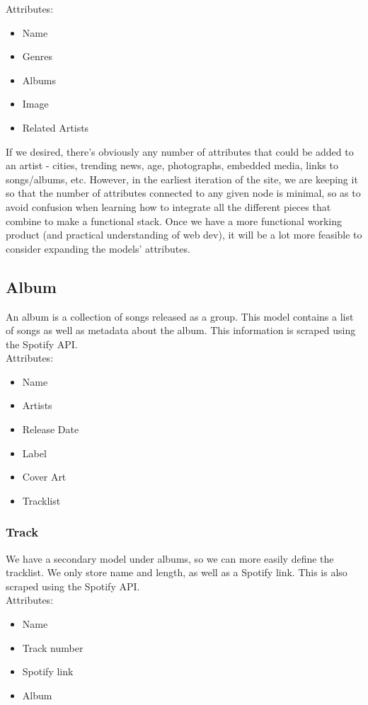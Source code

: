 \documentclass{scrartcl}
\begin{document}
Attributes:
\begin{itemize}
    \item Name
    \item Genres
    \item Albums
    \item Image
    \item Related Artists
\end{itemize}

If we desired, there’s obviously any number of attributes that could be added to an artist - cities, trending news, age, photographs, embedded media, links to songs/albums, etc. However, in the earliest iteration of the site, we are keeping it so that the number of attributes connected to any given node is minimal, so as to avoid confusion when learning how to integrate all the different pieces that combine to make a functional stack. Once we have a more functional working product (and practical understanding of web dev), it will be a lot more feasible to consider expanding the models’ attributes.

\subsection{Album}
An album is a collection of songs released as a group. This model contains a list of songs as well as metadata about the album. This information is scraped using the Spotify API.\\

Attributes:
\begin{itemize}
    \item Name
    \item Artists
    \item Release Date
    \item Label
    \item Cover Art
    \item Tracklist
\end{itemize}

\subsubsection{Track}
We have a secondary model under albums, so we can more easily define the tracklist. We only store name and length, as well as a Spotify link. This is also scraped using the Spotify API.\\

Attributes:
\begin{itemize}
    \item Name
    \item Track number
    \item Spotify link
    \item Album
\end{itemize}
\end{document}
